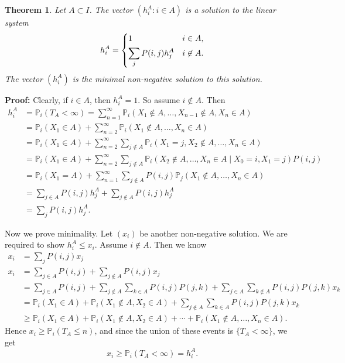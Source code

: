 \documentclass[12pt]{article}
\newtheorem{theorem}{Theorem}[section]
\theoremstyle{definition}
\theoremstyle{remark}
\begin{document}
\begin{theorem}
	Let $A \subset I$. The vector $(h_i^{A} : i \in A)$ is a solution to the linear system
	\[
	h_i^{A} =
	\begin{dcases}
		1 & i \in A, \\
		\sum_{j}P(i, j) h_j^{A} & i \not \in A.
	\end{dcases}
	\]
	The vector $(h_i^{A})$ is the minimal non-negative solution to this solution.
\end{theorem}

\begin{adjustbox}{minipage = \columnwidth - 25.5pt, margin=1em, frame=1pt, margin=0em}
\textbf{Proof:} Clearly, if $i \in A$, then $h_i^{A} = 1$. So assume $i \not \in A$. Then
\begin{align*}
	h_i^{A} &= \mathbb{P}_i(T_A < \infty) = \sum_{n = 1}^{\infty} \mathbb{P}_i(X_1 \not \in A, \ldots, X_{n-1} \not \in A, X_n \in A) \\
		&= \mathbb{P}_i(X_1 \in A) + \sum_{n = 2}^{\infty} \mathbb{P}_i(X_1 \not \in A, \ldots, X_n \in A) \\
		&= \mathbb{P}_i(X_1 \in A) + \sum_{n = 2}^{\infty} \sum_{j \not \in A} \mathbb{P}_i(X_1 = j, X_2 \not \in A, \ldots, X_n \in A) \\
		&= \mathbb{P}_i(X_1 \in A) + \sum_{n = 2}^{\infty} \sum_{j \not \in A}\mathbb{P}_i(X_2 \not \in A, \ldots, X_n \in A \mid X_0 = i, X_1 = j) P(i, j) \\
		&= \mathbb{P}_i(X_1 = A) + \sum_{n = 1}^{\infty} \sum_{j \not \in A}P(i, j) \mathbb{P}_j(X_1 \not \in A, \ldots, X_n \in A) \\
		&= \sum_{j \in A}P(i, j) h_j^{A} + \sum_{j \not \in A}P(i, j) h_j^{A} \\
		&= \sum_{j} P(i, j) h_j^{A}.
\end{align*}
\end{adjustbox}

\begin{adjustbox}{minipage = \columnwidth - 25.5pt, margin=1em, frame=1pt, margin=0em}
Now we prove minimality. Let $(x_i)$ be another non-negative solution. We are required to show $h_i^{A} \leq x_i$. Assume $i \not \in A$. Then we know
\begin{align*}
	x_i &= \sum_{j}P(i, j)x_j \\
	x_i &= \sum_{j \in A}P(i, j) + \sum_{j \not \in A}P(i, j)x_j \\
	    &= \sum_{j \in A}P(i, j) + \sum_{j \not \in A}\sum_{k \in A}P(i, j)P(j, k) + \sum_{j \in A}\sum_{k \not \in A}P(i, j)P(j, k) x_k \\
	    &= \mathbb{P}_i(X_1 \in A) + \mathbb{P}_i(X_1 \not \in A, X_2 \in A) + \sum_{j \not \in A}\sum_{k \in A}P(i, j)P(j, k)x_k \\
	    &\geq \mathbb{P}_i(X_1 \in A) + \mathbb{P}_i(X_1 \not \in A, X_2 \in A) + \cdots + \mathbb{P}_i(X_1 \not \in A, \ldots, X_n \in A).
\end{align*}
Hence $x_i \geq \mathbb{P}_i(T_A \leq n)$, and since the union of these events is $\{T_A < \infty\}$, we get
\[
	x_i \geq \mathbb{P}_i(T_A < \infty) = h_i^{A}
.\] 

\end{adjustbox}
\end{document}
